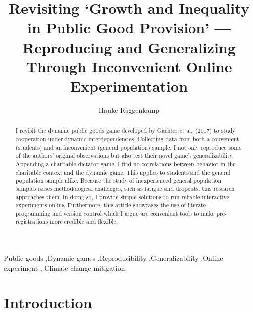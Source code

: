 \documentclass[
  authoryear,
  review,
  3p,
  onecolumn]{elsarticle}
\begin{document}
\begin{frontmatter}
\title{Revisiting `Growth and Inequality in Public Good Provision'
---Reproducing and Generalizing Through Inconvenient Online
Experimentation}
\author[1,2]{Hauke Roggenkamp%
%
}



        
\begin{abstract}
I revisit the dynamic public goods game developed by Gächter et
al.~(2017) to study cooperation under dynamic interdependencies.
Collecting data from both a convenient (students) and an inconvenient
(general population) sample, I not only reproduce some of the authors'
original observations but also test their novel game's generalizability.
Appending a charitable dictator game, I find no correlations between
behavior in the charitable context and the dynamic game. This applies to
students and the general population sample alike. Because the study of
inexperienced general population samples raises methodological
challenges, such as fatigue and dropouts, this research approaches them.
In doing so, I provide simple solutions to run reliable interactive
experiments online. Furthermore, this article showcases the use of
literate programming and version control which I argue are convenient
tools to make pre-registrations more credible and flexible.
\end{abstract}





\begin{keyword}
    Public goods \sep Dynamic
games \sep Reproducibility \sep Generalizability \sep Online
experiment \sep 
    Climate change mitigation
\end{keyword}
\end{frontmatter}\ifdefined\Shaded\renewenvironment{Shaded}{\begin{tcolorbox}[borderline west={3pt}{0pt}{shadecolor}, boxrule=0pt, sharp corners, breakable, frame hidden, interior hidden, enhanced]}{\end{tcolorbox}}\fi

\hypertarget{sec-intro}{%
\section{Introduction}\label{sec-intro}}
\end{document}
